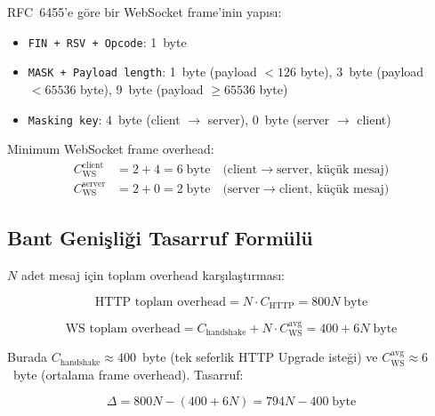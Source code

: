 RFC~6455'e g\"{o}re bir WebSocket frame'inin yap{\i}s{\i}:

\begin{itemize}
  \item \texttt{FIN + RSV + Opcode}: 1~byte
  \item \texttt{MASK + Payload length}: 1~byte (payload ${}<126$ byte), 3~byte (payload ${}<65536$ byte), 9~byte (payload $\geq 65536$ byte)
  \item \texttt{Masking key}: 4~byte (client $\to$ server), 0~byte (server $\to$ client)
\end{itemize}

Minimum WebSocket frame overhead:
\begin{align}
\label{eq:ws-overhead}
C_{\mathrm{WS}}^{\mathrm{client}} &= 2 + 4 = 6 \;\text{byte} \quad \text{(client} \to \text{server, k\"{u}\c{c}\"{u}k mesaj)} \\
C_{\mathrm{WS}}^{\mathrm{server}} &= 2 + 0 = 2 \;\text{byte} \quad \text{(server} \to \text{client, k\"{u}\c{c}\"{u}k mesaj)}
\end{align}

\subsection{Bant Geni\c{s}li\u{g}i Tasarruf Form\"{u}l\"{u}}
\label{sec:bandwidth-saving}

$N$ adet mesaj i\c{c}in toplam overhead kar\c{s}{\i}la\c{s}t{\i}rmas{\i}:

\begin{equation}
\label{eq:bandwidth-http}
\text{HTTP toplam overhead} = N \cdot C_{\mathrm{HTTP}} = 800N \;\text{byte}
\end{equation}

\begin{equation}
\label{eq:bandwidth-ws}
\text{WS toplam overhead} = C_{\mathrm{handshake}} + N \cdot C_{\mathrm{WS}}^{\mathrm{avg}} = 400 + 6N \;\text{byte}
\end{equation}

Burada $C_{\mathrm{handshake}} \approx 400$~byte (tek seferlik HTTP Upgrade iste\u{g}i) ve $C_{\mathrm{WS}}^{\mathrm{avg}} \approx 6$~byte (ortalama frame overhead). Tasarruf:

\begin{equation}
\label{eq:saving}
\Delta = 800N - (400 + 6N) = 794N - 400 \;\text{byte}
\end{equation}

